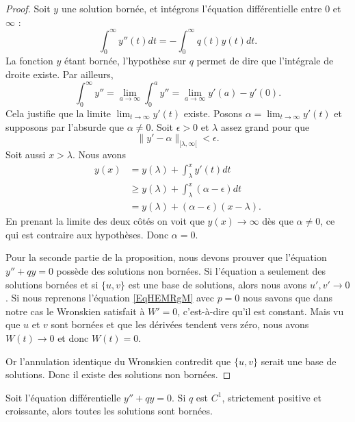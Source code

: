 \begin{proof}
	Soit \( y\) une solution bornée, et intégrons l'équation différentielle entre \( 0\) et \( \infty\) :
	\begin{equation}
		\int_0^{\infty}y''(t)dt=-\int_0^{\infty}q(t)y(t)dt.
	\end{equation}
	La fonction \( y\) étant bornée, l'hypothèse sur \( q\) permet de dire que l'intégrale de droite existe. Par ailleurs,
	\begin{equation}
		\int_0^{\infty}y''=\lim_{a\to \infty}\int_0^ay''=\lim_{a\to \infty}y'(a)-y'(0).
	\end{equation}
	Cela justifie que la limite \( \lim_{t\to \infty} y'(t)\) existe. Posons \( \alpha=\lim_{t\to \infty} y'(t)\) et supposons par l'absurde que \( \alpha\neq 0\). Soit \( \epsilon>0\) et \( \lambda\) assez grand pour que
	\begin{equation}
		\| y'-\alpha \|_{\mathopen[ \lambda , \infty [}<\epsilon.
	\end{equation}
	Soit aussi \( x>\lambda\). Nous avons
	\begin{subequations}
		\begin{align}
			y(x) & =y(\lambda) + \int_{\lambda}^x y'(t)dt                  \\
			     & \geq y(\lambda) + \int_{\lambda}^x (\alpha-\epsilon) dt \\
			     & =y(\lambda) + (\alpha-\epsilon)(x - \lambda).
		\end{align}
	\end{subequations}
	En prenant la limite des deux côtés on voit que \( y(x)\to \infty\) dès que \( \alpha\neq 0\), ce qui est contraire aux hypothèses. Donc \( \alpha=0\).

	Pour la seconde partie de la proposition, nous devons prouver que l'équation \( y''+qy=0\) possède des solutions non bornées. Si l'équation a seulement des solutions bornées et si \( \{ u,v \}\) est une base de solutions, alors nous avons \( u',v'\to 0\). Si nous reprenons l'équation \eqref{EqHEMRgM} avec \( p=0\) nous savons que dans notre cas le Wronskien satisfait à \( W'=0\), c'est-à-dire qu'il est constant. Mais vu que \( u\) et \( v\) sont bornées et que les dérivées tendent vers zéro, nous avons \( W(t)\to 0\) et donc \( W(t)=0\).

	Or l'annulation identique du Wronskien contredit que \( \{ u,v \}\) serait une base de solutions. Donc il existe des solutions non bornées.
\end{proof}

\begin{proposition} \label{PropMYskGa}
	Soit l'équation différentielle \( y''+qy=0\). Si \( q\) est \( C^1\), strictement positive et croissante, alors toutes les solutions sont bornées.
\end{proposition}

